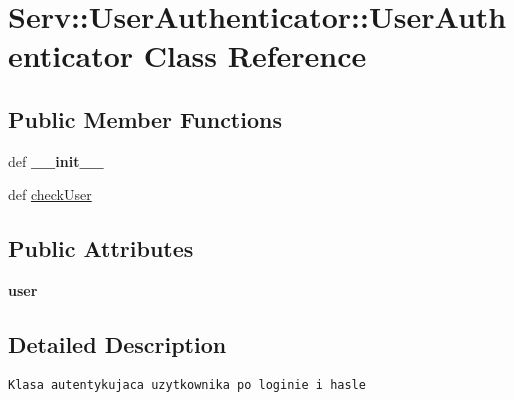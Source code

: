 \hypertarget{class_serv_1_1_user_authenticator_1_1_user_authenticator}{
\section{Serv::UserAuthenticator::UserAuthenticator Class Reference}
\label{class_serv_1_1_user_authenticator_1_1_user_authenticator}
}
\subsection*{Public Member Functions}
\begin{CompactItemize}
\item 
\hypertarget{class_serv_1_1_user_authenticator_1_1_user_authenticator_8da26a197368b560fc5b51a56cf95ccf}{
def \textbf{\_\-\_\-init\_\-\_\-}}
\label{class_serv_1_1_user_authenticator_1_1_user_authenticator_8da26a197368b560fc5b51a56cf95ccf}

\item 
def \hyperlink{class_serv_1_1_user_authenticator_1_1_user_authenticator_df35019818eb86047a9c8d1d415bf3e5}{checkUser}
\end{CompactItemize}
\subsection*{Public Attributes}
\begin{CompactItemize}
\item 
\hypertarget{class_serv_1_1_user_authenticator_1_1_user_authenticator_6f0f3992518647fc45cf548f9c5a79e8}{
\textbf{user}}
\label{class_serv_1_1_user_authenticator_1_1_user_authenticator_6f0f3992518647fc45cf548f9c5a79e8}

\end{CompactItemize}


\subsection{Detailed Description}


\footnotesize\begin{verbatim}Klasa autentykujaca uzytkownika po loginie i hasle

\end{verbatim}
\normalsize
 


